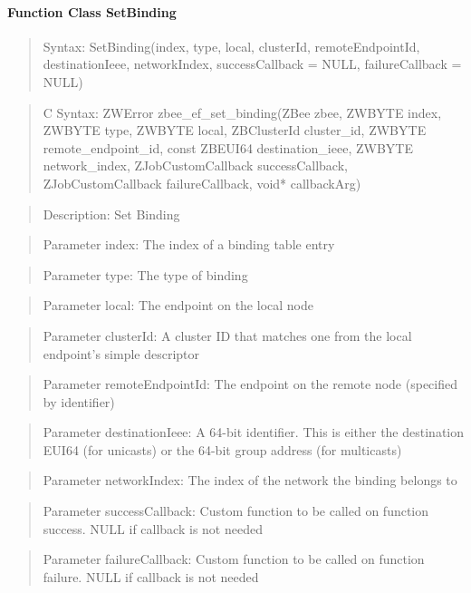 \paragraph{Function Class SetBinding}
\begin{quote}Syntax: SetBinding(index, type, local, clusterId, remoteEndpointId, destinationIeee, networkIndex, successCallback = NULL, failureCallback = NULL)\end{quote}
\begin{quote}C Syntax: ZWError zbee\_ef\_set\_binding(ZBee zbee, ZWBYTE index, ZWBYTE type, ZWBYTE local, ZBClusterId cluster\_id, ZWBYTE remote\_endpoint\_id, const ZBEUI64 destination\_ieee, ZWBYTE network\_index, ZJobCustomCallback successCallback, ZJobCustomCallback failureCallback, void* callbackArg)\end{quote}
\begin{quote}Description: Set Binding\end{quote}
\begin{quote}Parameter index: The index of a binding table entry\end{quote}
\begin{quote}Parameter type: The type of binding\end{quote}
\begin{quote}Parameter local: The endpoint on the local node\end{quote}
\begin{quote}Parameter clusterId: A cluster ID that matches one from the local endpoint's simple descriptor\end{quote}
\begin{quote}Parameter remoteEndpointId: The endpoint on the remote node (specified by identifier)\end{quote}
\begin{quote}Parameter destinationIeee: A 64-bit identifier. This is either the destination EUI64 (for unicasts) or the 64-bit group address (for multicasts)\end{quote}
\begin{quote}Parameter networkIndex: The index of the network the binding belongs to\end{quote}
\begin{quote}Parameter successCallback: Custom function to be called on function success. NULL if callback is not needed\end{quote}
\begin{quote}Parameter failureCallback: Custom function to be called on function failure. NULL if callback is not needed\end{quote}


